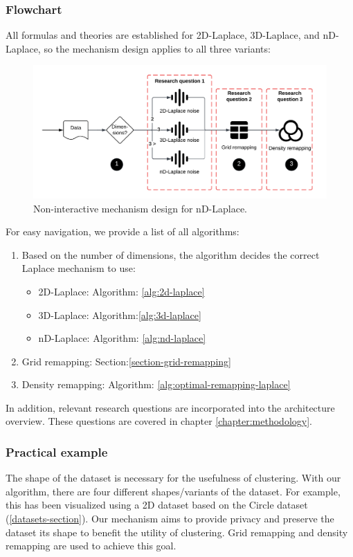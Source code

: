 \subsubsection{Flowchart}
All formulas and theories are established for 2D-Laplace, 3D-Laplace, and nD-Laplace, so the mechanism design applies to all three variants:
\begin{figure}[H]
  \includegraphics[width=1.1\textwidth]{TheorethicalFramework//ND-Laplace//Images/overview.png}
  \caption{Non-interactive mechanism design for nD-Laplace.}
  \label{fig:final-mechanism-design}
\end{figure}
For easy navigation, we provide a list of all algorithms:
\begin{enumerate}
  \item Based on the number of dimensions, the algorithm decides the correct Laplace mechanism to use:
        \begin{itemize}
          \item 2D-Laplace:  Algorithm: \ref{alg:2d-laplace}
          \item 3D-Laplace:  Algorithm:\ref{alg:3d-laplace}
          \item nD-Laplace: Algorithm: \ref{alg:nd-laplace}
        \end{itemize}
  \item Grid remapping: Section:\ref{section-grid-remapping}
  \item Density remapping: Algorithm: \ref{alg:optimal-remapping-laplace}
\end{enumerate}
In addition, relevant research questions are incorporated into the architecture overview.
These questions are covered in chapter \ref{chapter:methodology}.
\subsubsection{Practical example}
The shape of the dataset is necessary for the usefulness of clustering.
With our algorithm, there are four different shapes/variants of the dataset.
For example, this has been visualized using a 2D dataset based on the Circle dataset (\ref{datasets-section}).
Our mechanism aims to provide privacy and preserve the dataset its shape to benefit the utility of clustering.
Grid remapping and density remapping are used to achieve this goal.

